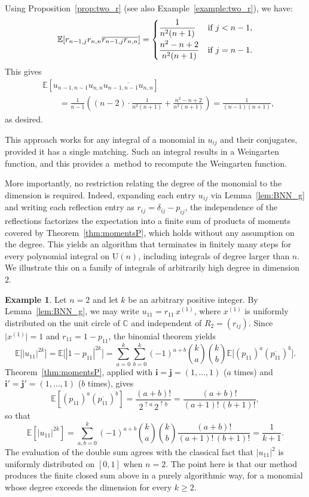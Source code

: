 \documentclass[pdftex]{sigma}
\numberwithin{equation}{section}
\theoremstyle{definition}
\newtheorem{Example}[Theorem]{Example}
\newcommand{\UU}{\mathrm{U}}
\begin{document}
Using Proposition~\ref{prop:two_r} (see also Example~\ref{example:two_r}), we have:
\[
\mathbb{E} [r_{n-1,j} r_{n,n} \overline{r_{n-1,j} r_{n,n}}] =
\begin{cases}
 \dfrac{1}{n^2(n+1)} & \text{if $j <n-1$}, \vspace{1mm}\\
 \dfrac{n^2-n+2}{n^2(n+1)} & \text{if $j =n-1$}.
\end{cases}
\]
This gives
\begin{align*}
&\mathbb{E} [ u_{n-1,n-1} u_{n,n} \overline{u_{n-1,n-1} u_{n, n}} ]\\
& \qquad
= \frac{1}{n-1} \left( (n-2) \cdot \frac{1}{n^2(n+1)} + \frac{n^2-n+2}{n^2(n+1)}
\right) = \frac{1}{(n-1)(n+1)},
\end{align*}
as desired.

This approach works for any integral of a monomial in $u_{ij}$ and their conjugates,
provided it has a single matching.
Such an integral results in a Weingarten function, and this provides a~method to recompute the Weingarten function.

More importantly, no restriction relating the degree of the monomial to the dimension is required.
Indeed, expanding each entry $u_{ij}$ via Lemma~\ref{lem:BNN_g} and writing each reflection entry as $r_{ij}= \delta_{ij}-p_{ij}$, the independence of the reflections factorizes the expectation into a finite sum of products of moments covered by Theorem~\ref{thm:momentsP}, which holds without any assumption on the degree.
This yields an algorithm that terminates in finitely many steps for every polynomial integral on $\UU(n)$, including integrals of degree larger than $n$.
We illustrate this on a family of integrals of arbitrarily high degree in dimension $2$.

\begin{Example} \label{ex:U2_high_degree}
Let $n=2$ and let $k$ be an arbitrary positive integer.
By Lemma~\ref{lem:BNN_g}, we may write $u_{11}=r_{11}\, x^{(1)}$, where $x^{(1)}$ is uniformly distributed on the unit circle of $\mathbb{C}$ and independent of $R_2=(r_{ij})$.
Since $\bigl|x^{(1)}\bigr|=1$ and $r_{11}=1-p_{11}$, the binomial theorem yields
\[
\mathbb{E}\bigl[|u_{11}|^{2k}\bigr] = \mathbb{E}\bigl[|1-p_{11}|^{2k}\bigr]
= \sum_{a=0}^{k} \sum_{b=0}^{k} (-1)^{a+b} \binom{k}{a} \binom{k}{b} \mathbb{E}\bigl[(p_{11})^a (\overline{p_{11}})^b\bigr].
\]
Theorem~\ref{thm:momentsP}, applied with $\bm{i}=\bm{j}=(1,\dots,1)$ ($a$ times) and $\bm{i}'=\bm{j}'=(1,\dots,1)$ ($b$ times), gives
\[
\mathbb{E}\left[(p_{11})^a (\overline{p_{11}})^b\right] = \frac{(a+b)!}{2^{\uparrow a}\, 2^{\uparrow b}} = \frac{(a+b)!}{(a+1)!\,(b+1)!},
\]
so that
\[
\mathbb{E}\left[|u_{11}|^{2k}\right] = \sum_{a,b=0}^{k} (-1)^{a+b} \binom{k}{a}\binom{k}{b} \frac{(a+b)!}{(a+1)!\,(b+1)!} = \frac{1}{k+1}.
\]
The evaluation of the double sum agrees with the classical fact that $|u_{11}|^2$ is uniformly distributed on $[0,1]$ when $n=2$.
The point here is that our method produces the finite closed sum above in a purely algorithmic way, for a monomial whose degree exceeds the dimension for every $k \ge 2$.
\end{Example}
\end{document}
